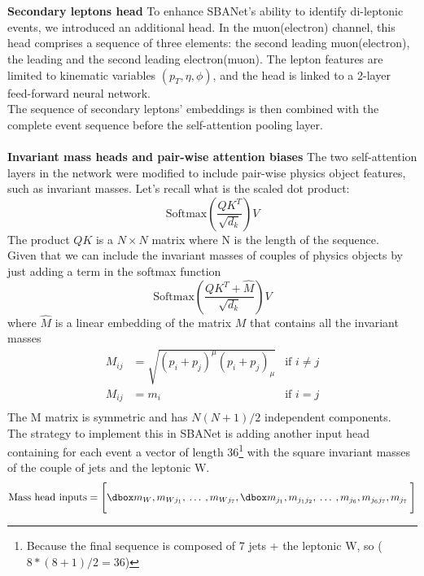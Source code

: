 \\  
\\
\textbf{Secondary leptons head} 
To enhance SBANet's ability to identify di-leptonic events, we introduced an additional head. In the muon(electron) channel, this head comprises a sequence of three elements: the second leading muon(electron), the leading and the second leading electron(muon).
The lepton features are limited to kinematic variables $(p_T,\eta,\phi)$, and the head is linked to a 2-layer feed-forward neural network.\\
The sequence of secondary leptons' embeddings is then combined with the complete event sequence before the self-attention pooling layer.
\\
\\
\textbf{Invariant mass heads and pair-wise attention biases} The two self-attention layers in the network were modified to include pair-wise physics object features, such as invariant masses.
Let's recall what is the scaled dot product:
\begin{equation}
    \text{Softmax}\left( \frac{QK^T}{\sqrt{d_k}} \right)V
\end{equation}
The product $QK$ is a $N\times N$ matrix where N is the length of the sequence.\\
Given that we can include the invariant masses of couples of physics objects by just adding a term in the softmax function
\begin{equation}
    \text{Softmax}\left( \frac{QK^T+\hat{M}}{\sqrt{d_k}} \right)V
\end{equation}
where $\hat{M}$ is a linear embedding of the matrix $M$ that contains all the invariant masses
\begin{equation}
\begin{aligned}
    M_{ij}&=\sqrt{(p_i+p_j)^\mu(p_i+p_j)_\mu} & \text{if } i\neq j\\
    M_{ij}&=m_i & \text{if } i=j\\
\end{aligned}
\end{equation}
The M matrix is symmetric and has $N(N+1)/2$ independent components.\\
The strategy to implement this in SBANet is adding another input head containing for each event a vector of length 36\footnote{Because the final sequence is composed of 7 jets + the leptonic W, so ($8*(8+1)/2=36$)} with the square invariant masses of the couple of jets and the leptonic W.
\begin{equation*}
    \text{Mass head inputs}=\Biggl[ \dboxed{m_W,m_{Wj_1},\:\dots\:,m_{Wj_7},\dboxed{m_{j_1},m_{j_1 j_2},\:\dots\:,m_{j_6},m_{j_6 j_7},m_{j_7}}}\: \Biggr]
\end{equation*}

